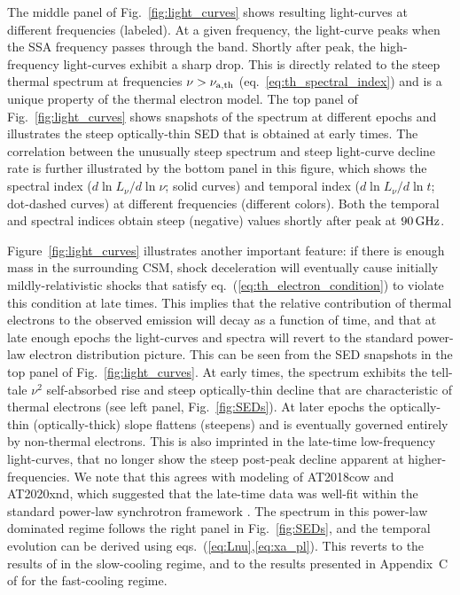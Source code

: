 \documentclass[twocolumn]{aastex63}
\begin{document}
The middle panel of Fig.~\ref{fig:light_curves} shows resulting light-curves at different frequencies (labeled). At a given frequency, the light-curve peaks when the SSA frequency passes through the band.
Shortly after peak, the high-frequency light-curves exhibit a sharp drop. This is directly related to the steep thermal spectrum at frequencies $\nu > \nu_{\rm a,th}$ (eq.~\ref{eq:th_spectral_index}) and is a unique property of the thermal electron model. The top panel of Fig.~\ref{fig:light_curves} shows snapshots of the spectrum at different epochs and illustrates the steep optically-thin SED that is obtained at early times.
The correlation between the unusually steep spectrum and steep light-curve decline rate is further illustrated by the bottom panel in this figure, which shows the spectral index ($d\ln L_\nu / d\ln \nu$; solid curves) and temporal index ($d\ln L_\nu / d\ln t$; dot-dashed curves) at different frequencies (different colors). Both the temporal and spectral indices obtain steep (negative) values shortly after peak at $90\,{\rm GHz}$.

Figure~\ref{fig:light_curves} illustrates another important feature:  if there is enough mass in the surrounding CSM, shock deceleration will eventually cause initially mildly-relativistic shocks that satisfy eq.~(\ref{eq:th_electron_condition}) to violate this condition at late times. This implies that the relative contribution of thermal electrons to the observed emission will decay as a function of time, and that at late enough epochs the light-curves and spectra will revert to the standard power-law electron distribution picture.
This can be seen from the SED snapshots in the top panel of Fig.~\ref{fig:light_curves}. At early times, the spectrum exhibits the tell-tale $\nu^2$ self-absorbed rise and steep optically-thin decline that are characteristic of thermal electrons (see left panel, Fig.~\ref{fig:SEDs}). At later epochs the optically-thin (optically-thick) slope flattens (steepens) and is eventually governed entirely by non-thermal electrons.
This is also imprinted in the late-time low-frequency light-curves, that no longer show the steep post-peak decline apparent at higher-frequencies.
We note that this agrees with modeling of AT2018cow and AT2020xnd, which suggested that the late-time data was well-fit within the standard power-law synchrotron framework \citep{Margutti+19,Ho+21b}.
The spectrum in this power-law dominated regime follows the right panel in Fig.~\ref{fig:SEDs}, and the temporal evolution can be derived using eqs.~(\ref{eq:Lnu},\ref{eq:xa_pl}). This reverts to the results of \cite{Chevalier98} in the slow-cooling regime, and to the results presented in Appendix~C of \cite{Ho+21b} for the fast-cooling regime.
\end{document}
